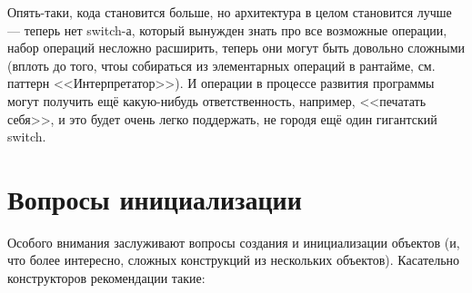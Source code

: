 \documentclass[a5paper]{article}
\begin{document}
Опять-таки, кода становится больше, но архитектура в целом становится лучше --- теперь нет switch-а, который вынужден знать про все возможные операции, набор операций несложно расширить, теперь они могут быть довольно сложными (вплоть до того, чтоы собираться из элементарных операций в рантайме, см. паттерн <<Интерпретатор>>). И операции в процессе развития программы могут получить ещё какую-нибудь ответственность, например, <<печатать себя>>, и это будет очень легко поддержать, не городя ещё один гигантский switch.

\section{Вопросы инициализации}

Особого внимания заслуживают вопросы создания и инициализации объектов (и, что более интересно, сложных конструкций из нескольких объектов). Касательно конструкторов рекомендации такие:
\end{document}
